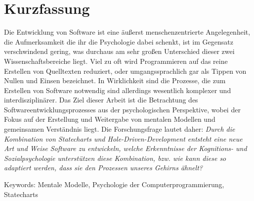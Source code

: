 \chapter{Kurzfassung}
\noindent
Die Entwicklung von Software ist eine äußerst menschenzentrierte Angelegenheit, die Aufmerksamkeit die ihr die Psychologie dabei schenkt, ist im Gegensatz verschwindend gering, was durchaus am sehr großen Unterschied dieser zwei Wissenschaftsbereiche liegt.
Viel zu oft wird Programmieren auf das reine Erstellen von Quelltexten reduziert, oder umgangssprachlich gar als Tippen von Nullen und Einsen bezeichnet.
In Wirklichkeit sind die Prozesse, die zum Erstellen von Software notwendig sind allerdings wesentlich komplexer und interdisziplinärer.
Das Ziel dieser Arbeit ist die Betrachtung des Softwareentwicklungsprozesses aus der psychologischen Perspektive, wobei der Fokus auf der Erstellung und Weitergabe von mentalen Modellen und gemeinsamen Verständnis liegt.
Die Forschungsfrage lautet daher: \emph{Durch die Kombination von Statecharts und Hole-Driven-Development entsteht eine neue Art und Weise Software zu entwickeln, welche Erkenntnisse der Kognitions- und Sozialpsychologie unterstützen diese Kombination, bzw. wie kann diese so adaptiert werden, dass sie den Prozessen unseres Gehirns ähnelt?}

\vspace{2cm}
\noindent
Keywords: Mentale Modelle, Psychologie der Computerprogrammierung, Statecharts